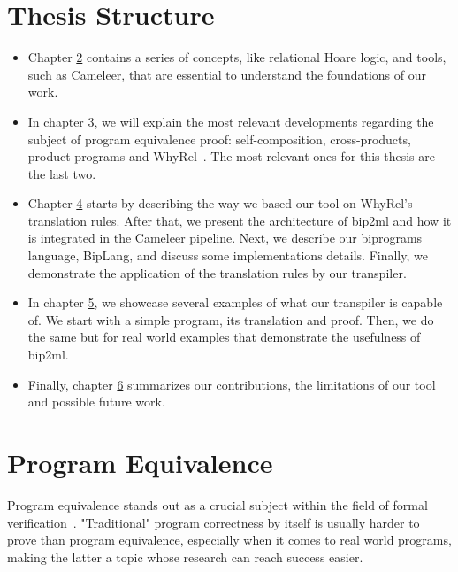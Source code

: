 \section{Thesis Structure}

\begin{itemize}
    \setlength\itemsep{0.1em}
    \item Chapter \hyperref[cha:background]{2} contains a series of concepts, like relational Hoare logic, and tools, such as Cameleer, that are essential to understand the foundations of our work.

    \item In chapter \hyperref[cha:state_of_the_art]{3}, we will explain the most relevant developments regarding the subject of program equivalence proof: self-composition, cross-products, product programs and WhyRel~\cite{whyrel}.
    The most relevant ones for this thesis are the last two.

    \item Chapter \hyperref[cha:methodology]{4} starts by describing the way we based our tool on WhyRel's translation rules.
    After that, we present the architecture of bip2ml and how it is integrated in the Cameleer pipeline.
    Next, we describe our biprograms language, BipLang, and discuss some implementations details.
    Finally, we demonstrate the application of the translation rules by our transpiler.

    \item In chapter \hyperref[cha:case_studies]{5}, we showcase several examples of what our transpiler is capable of. 
    We start with a simple program, its translation and proof.
    Then, we do the same but for real world examples that demonstrate the usefulness of bip2ml.
    
    \item Finally, chapter \hyperref[cha:conclusion]{6} summarizes our contributions, the limitations of our tool and possible future work.
\end{itemize}




\iffalse
\section{Program Equivalence}
\label{sec:program_equivalence}

Program equivalence stands out as a crucial subject within the field of formal verification~\cite{DBLP:journals/fmsd/Strichman18}.
"Traditional" program correctness by itself is usually harder to prove than program equivalence, especially when it comes to real world programs, making the latter a topic whose research can reach success easier.

